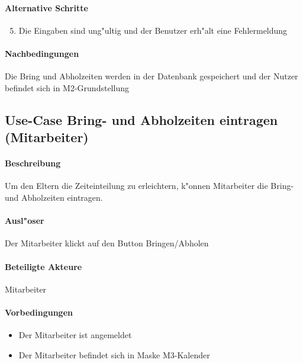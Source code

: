   \paragraph{Alternative Schritte}
  \begin{enumerate}
  \setcounter{enumi}{4}
   \item  Die Eingaben sind ung"ultig und der Benutzer erh"alt eine Fehlermeldung
  \end{enumerate}

  \paragraph{Nachbedingungen}
  Die Bring und Abholzeiten werden in der Datenbank gespeichert und der Nutzer befindet sich in M2-Grundstellung
  
  
  
  
	\newpage
	\subsection{Use-Case Bring- und Abholzeiten eintragen (Mitarbeiter)}
	\paragraph{Beschreibung}
	Um den Eltern die Zeiteinteilung zu erleichtern, k"onnen Mitarbeiter die Bring- und Abholzeiten eintragen.
	\paragraph{Ausl"oser}
	Der Mitarbeiter klickt auf den Button \dq Bringen/Abholen\dq
	\paragraph{Beteiligte Akteure}   \leavevmode \newline
	Mitarbeiter
	\paragraph{Vorbedingungen}
	\begin{itemize}
		\item Der Mitarbeiter ist angemeldet
		\item Der Mitarbeiter befindet sich in Maske M3-Kalender
	\end{itemize}
	
